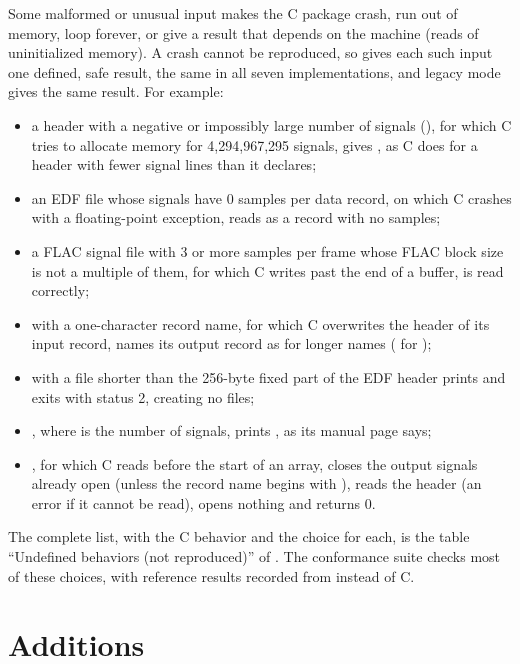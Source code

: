 Some malformed or unusual input makes the C package crash, run out of
memory, loop forever, or give a result that depends on the machine (reads of
uninitialized memory). A crash cannot be reproduced, so \wfdbx{} gives each
such input one defined, safe result, the same in all seven implementations,
and legacy mode gives the same result. For example:
\begin{itemize}
\item a header with a negative or impossibly large number of signals
  (), for which C tries to allocate memory for 4,294,967,295
  signals, gives , as
  C does for a header with fewer signal lines than it declares;
\item an EDF file whose signals have 0 samples per data record, on which C
  crashes with a floating-point exception, reads as a record with no
  samples;
\item a FLAC signal file with 3 or more samples per frame whose FLAC block
  size is not a multiple of them, for which C writes past the end of a
  buffer, is read correctly;
\item {} with a one-character record name, for which C
  overwrites the header of its input record, names its output record as for
  longer names ( for );
\item {} with a file shorter than the 256-byte fixed part of the
  EDF header prints  and exits
  with status 2, creating no files;
\item {}, where  is the number of signals, prints
  \code{[INVALID]}, as its manual page says;
\item {}, for which C reads before the start of
  an array, closes the output signals already open (unless the record name
  begins with \code{+}), reads the header (an error if it cannot be read),
  opens nothing and returns 0.
\end{itemize}
The complete list, with the C behavior and the \wfdbx{} choice for each, is
the table ``Undefined behaviors (not reproduced)'' of
. The conformance suite checks most of
these choices, with reference results recorded from \wfdbx{} instead of C.

\section{Additions}
\label{sec:additions}

